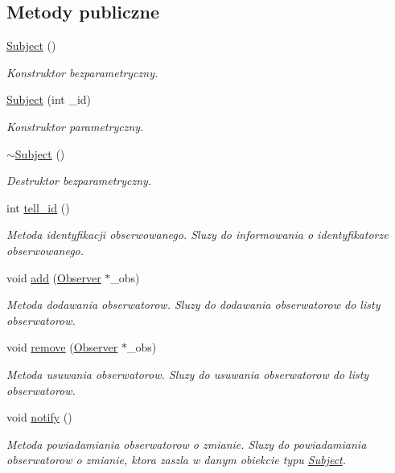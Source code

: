 \subsection*{Metody publiczne}
\begin{DoxyCompactItemize}
\item 
\hyperlink{class_subject_ab468044832c824c6d6c2f46272655207}{Subject} ()
\begin{DoxyCompactList}\small\item\em Konstruktor bezparametryczny. \end{DoxyCompactList}\item 
\hyperlink{class_subject_a86e314de8431f0d02c2b071b588063b1}{Subject} (int \-\_\-id)
\begin{DoxyCompactList}\small\item\em Konstruktor parametryczny. \end{DoxyCompactList}\item 
\hyperlink{class_subject_a7c4f522850f718466e5be7eb55ba1969}{$\sim$\-Subject} ()
\begin{DoxyCompactList}\small\item\em Destruktor bezparametryczny. \end{DoxyCompactList}\item 
int \hyperlink{class_subject_a9023d1b44418c4e7f6f228c91c6bfd31}{tell\-\_\-id} ()
\begin{DoxyCompactList}\small\item\em Metoda identyfikacji obserwowanego. Sluzy do informowania o identyfikatorze obserwowanego. \end{DoxyCompactList}\item 
void \hyperlink{class_subject_a2e28d0d819a8665f5b77c1bfac1f1d1c}{add} (\hyperlink{class_observer}{Observer} $\ast$\-\_\-obs)
\begin{DoxyCompactList}\small\item\em Metoda dodawania obserwatorow. Sluzy do dodawania obserwatorow do listy obserwatorow. \end{DoxyCompactList}\item 
void \hyperlink{class_subject_a1382feba0caa94298a5105a3175f1917}{remove} (\hyperlink{class_observer}{Observer} $\ast$\-\_\-obs)
\begin{DoxyCompactList}\small\item\em Metoda usuwania obserwatorow. Sluzy do usuwania obserwatorow do listy obserwatorow. \end{DoxyCompactList}\item 
void \hyperlink{class_subject_af104c2baf37c7aa63b2ef6d32c2b3a9c}{notify} ()
\begin{DoxyCompactList}\small\item\em Metoda powiadamiania obserwatorow o zmianie. Sluzy do powiadamiania obserwatorow o zmianie, ktora zaszla w danym obiekcie typu \hyperlink{class_subject}{Subject}. \end{DoxyCompactList}\end{DoxyCompactItemize}
